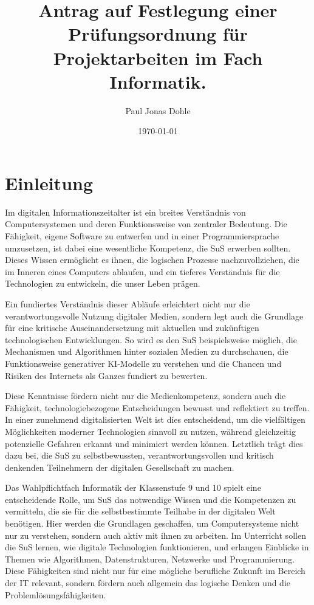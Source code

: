 \documentclass[a4paper,12pt]{article}
\title{Antrag auf Festlegung einer Prüfungsordnung für Projektarbeiten im Fach Informatik.}
\author{Paul Jonas Dohle}
\date{\today}
\begin{document}
\maketitle
\thispagestyle{empty} %
\newpage

\tableofcontents


\section{Einleitung}
Im digitalen Informationszeitalter ist ein breites Verständnis von Computersystemen und deren Funktionsweise von zentraler Bedeutung. Die Fähigkeit, eigene Software zu entwerfen und in einer Programmiersprache umzusetzen, ist dabei eine wesentliche Kompetenz, die SuS erwerben sollten. Dieses Wissen ermöglicht es ihnen, die logischen Prozesse nachzuvollziehen, die im Inneren eines Computers ablaufen, und ein tieferes Verständnis für die Technologien zu entwickeln, die unser Leben prägen.

Ein fundiertes Verständnis dieser Abläufe erleichtert nicht nur die verantwortungsvolle Nutzung digitaler Medien, sondern legt auch die Grundlage für eine kritische Auseinandersetzung mit aktuellen und zukünftigen technologischen Entwicklungen. So wird es den SuS beispielsweise möglich, die Mechanismen und Algorithmen hinter sozialen Medien zu durchschauen, die Funktionsweise generativer KI-Modelle zu verstehen und die Chancen und Risiken des Internets als Ganzes fundiert zu bewerten.

Diese Kenntnisse fördern nicht nur die Medienkompetenz, sondern auch die Fähigkeit, technologiebezogene Entscheidungen bewusst und reflektiert zu treffen. In einer zunehmend digitalisierten Welt ist dies entscheidend, um die vielfältigen Möglichkeiten moderner Technologien sinnvoll zu nutzen, während gleichzeitig potenzielle Gefahren erkannt und minimiert werden können. Letztlich trägt dies dazu bei, die SuS zu selbstbewussten, verantwortungsvollen und kritisch denkenden Teilnehmern der digitalen Gesellschaft zu machen.

Das Wahlpflichtfach Informatik der Klassenstufe 9 und 10 spielt eine entscheidende Rolle, um SuS das notwendige Wissen und die Kompetenzen zu vermitteln, die sie für die selbstbestimmte Teilhabe in der digitalen Welt benötigen. Hier werden die Grundlagen geschaffen, um Computersysteme nicht nur zu verstehen, sondern auch aktiv mit ihnen zu arbeiten. Im Unterricht sollen die SuS lernen, wie digitale Technologien funktionieren, und erlangen Einblicke in Themen wie Algorithmen, Datenstrukturen, Netzwerke und Programmierung. Diese Fähigkeiten sind nicht nur für eine mögliche berufliche Zukunft im Bereich der IT relevant, sondern fördern auch allgemein das logische Denken und die Problemlösungsfähigkeiten.
\end{document}
